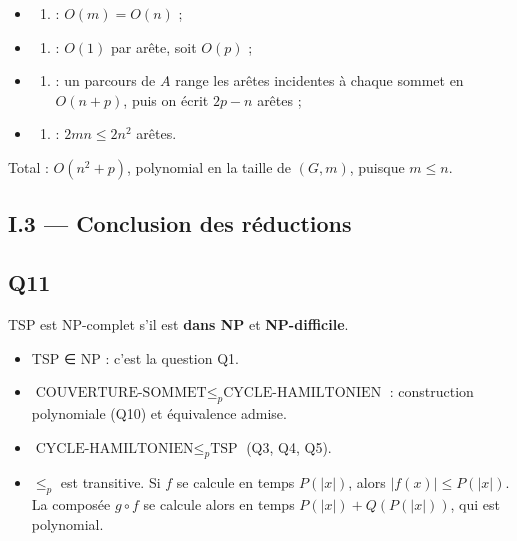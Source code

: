 \documentclass[11pt,a4paper]{article}
\providecommand{\tightlist}{\setlength{\itemsep}{0pt}\setlength{\parskip}{0pt}}
\begin{document}
\begin{itemize}
\item
  \begin{enumerate}
  \def\labelenumi{(\roman{enumi})}
  \tightlist
  \item
    : \(O(m)=O(n)\) ;
  \end{enumerate}
\item
  \begin{enumerate}
  \def\labelenumi{(\roman{enumi})}
  \setcounter{enumi}{1}
  \tightlist
  \item
    : \(O(1)\) par arête, soit \(O(p)\) ;
  \end{enumerate}
\item
  \begin{enumerate}
  \def\labelenumi{(\roman{enumi})}
  \setcounter{enumi}{2}
  \tightlist
  \item
    : un parcours de \(A\) range les arêtes incidentes à chaque sommet en \(O(n+p)\), puis on écrit \(2p-n\) arêtes ;
  \end{enumerate}
\item
  \begin{enumerate}
  \def\labelenumi{(\roman{enumi})}
  \setcounter{enumi}{3}
  \tightlist
  \item
    : \(2mn\le 2n^2\) arêtes.
  \end{enumerate}
\end{itemize}

Total : \textbf{\(O(n^2+p)\)}, polynomial en la taille de \((G,m)\), puisque \(m\le n\).

\hypertarget{i.3-conclusion-des-ruxe9ductions}{%
\subsection{I.3 --- Conclusion des réductions}\label{i.3-conclusion-des-ruxe9ductions}}

\hypertarget{q11}{%
\subsection{Q11}\label{q11}}

TSP est NP-complet s'il est \textbf{dans NP} et \textbf{NP-difficile}.

\begin{itemize}
\tightlist
\item
  TSP ∈ NP : c'est la question Q1.
\item
  \(\text{COUVERTURE-SOMMET}\le_p\text{CYCLE-HAMILTONIEN}\) : construction polynomiale (Q10) et équivalence admise.
\item
  \(\text{CYCLE-HAMILTONIEN}\le_p\text{TSP}\) (Q3, Q4, Q5).
\item
  \(\le_p\) est transitive. Si \(f\) se calcule en temps \(P(|x|)\), alors \(|f(x)|\le P(|x|)\). La composée \(g\circ f\) se calcule alors en temps \(P(|x|)+Q(P(|x|))\), qui est polynomial.
\end{itemize}
\end{document}
